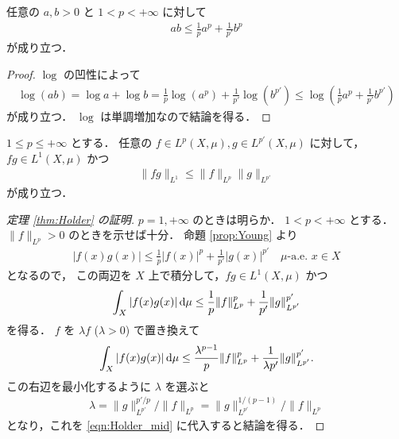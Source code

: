 \begin{proposition}\label{prop:Young}
    任意の $a,b>0$ と $1<p<+\infty$ に対して
    \begin{align*}
        ab\le\frac{1}{p}a^p+\frac{1}{p'}b^p
    \end{align*}
    が成り立つ．
\end{proposition}

\begin{proof}
    $\log$ の凹性によって
    \begin{align*}
        \log(ab)
        =\log a+\log b
        =\frac{1}{p}\log(a^p)+\frac{1}{p'}\log(b^{p'})
        \le\log\!\left(\frac{1}{p}a^p+\frac{1}{p'}b^{p'}\right)
    \end{align*}
    が成り立つ．
    $\log$ は単調増加なので結論を得る．
\end{proof}

\begin{theorem}\label{thm:Holder}
    $1\le p\le+\infty$ とする．
    任意の $f\in L^p(X,\mu),g\in L^{p'}(X,\mu)$ に対して，$fg\in L^1(X,\mu)$ かつ
    \begin{align*}
        \|fg\|_{L^1}\le\|f\|_{L^p}\|g\|_{L^{p'}}
    \end{align*}
    が成り立つ．
\end{theorem}

\begin{proof}[定理 \ref{thm:Holder} の証明]
    $p=1,+\infty$ のときは明らか．
    $1<p<+\infty$ とする．
    $\|f\|_{L^p}>0$ のときを示せば十分．
    命題 \ref{prop:Young} より
    \begin{align*}
        |f(x)g(x)|\le\frac{1}{p}|f(x)|^p+\frac{1}{p'}|g(x)|^{p'}\quad\textrm{$\mu$-a.e.\ $x\in X$}
    \end{align*}
    となるので，
    この両辺を $X$ 上で積分して，$fg\in L^1(X,\mu)$ かつ
    \begin{align*}
        \int_X|f(x)g(x)|\,\mathrm{d}\mu
        \le\frac{1}{p}\|f\|_{L^p}^p+\frac{1}{p'}\|g\|_{L^{p'}}^{p'}
    \end{align*}
    を得る．
    $f$ を $\lambda f$ ($\lambda>0$) で置き換えて
    \begin{align}
        \int_X|f(x)g(x)|\,\mathrm{d}\mu
        \le\frac{\lambda^{p-1}}{p}\|f\|_{L^p}^p+\frac{1}{\lambda p'}\|g\|_{L^{p'}}^{p'}.
        \label{eqn:Holder_mid}
    \end{align}
    この右辺を最小化するように $\lambda$ を選ぶと
    \begin{align*}
        \lambda
        =\|g\|_{L^{p'}}^{p'/p}/\|f\|_{L^p}
        =\|g\|_{L^{p'}}^{1/(p-1)}/\|f\|_{L^p}
    \end{align*}
    となり，これを \eqref{eqn:Holder_mid} に代入すると結論を得る．
\end{proof}

